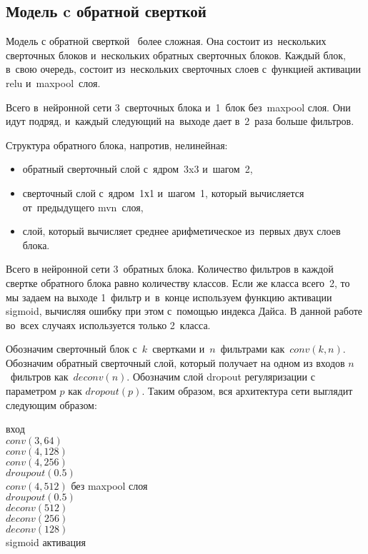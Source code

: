 \subsection{Модель c обратной сверткой}
 
Модель с обратной сверткой~\cite{fcn} более сложная. Она состоит из~нескольких сверточных блоков и~нескольких обратных сверточных блоков. Каждый блок, в~свою очередь, состоит из~нескольких сверточных слоев с~функцией активации relu и~maxpool~слоя. 

Всего в~нейронной сети 3~сверточных блока и~1~блок без~maxpool слоя. Они идут подряд, и~каждый следующий на~выходе дает в~2~раза больше фильтров. 

Структура обратного блока, напротив, нелинейная:

\begin{itemize}
  \item обратный сверточный слой с~ядром~3x3 и~шагом~2,
  \item сверточный слой с~ядром~1х1 и~шагом~1, который вычисляется от~предыдущего mvn~слоя,
  \item слой, который вычисляет среднее арифметическое из~первых двух слоев блока.
\end{itemize}

Всего в нейронной сети 3~обратных блока. Количество фильтров в каждой свертке обратного блока равно количеству классов. Если же класса всего~2, то мы задаем на выходе 1~фильтр и~в~конце используем функцию активации sigmoid, вычисляя ошибку при этом с~помощью индекса Дайса. В данной работе во~всех случаях используется только 2~класса.

Обозначим сверточный блок с~$k$~свертками и~$n$~фильтрами как~$conv(k,n)$. Обозначим обратный сверточный слой, который получает на одном из входов $n$~фильтров как~$deconv(n)$. Обозначим слой dropout регуляризации с параметром $p$ как $dropout(p)$. Таким образом, вся архитектура сети выглядит следующим образом:

\begin{center}
  \begin{tabular}
    вход                              \\ \hline
    $conv(3,64)$                      \\ \hline
    $conv(4,128)$                     \\ \hline
    $conv(4,256)$                     \\ \hline
    $droupout(0.5)$                   \\ \hline
    $conv(4,512)$ без maxpool слоя    \\ \hline
    $droupout(0.5)$                   \\ \hline
    $deconv(512)$                     \\ \hline
    $deconv(256)$                     \\ \hline  
    $deconv(128)$                     \\ \hline      
    sigmoid активация                 \\
  \end{tabular}
\end{center}

